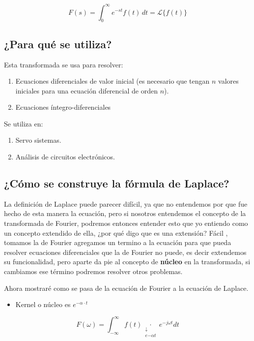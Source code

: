 \[
F(s) = \int_{0}^{\infty} \! e^{-st} f(t)  \,dt = \mathscr{L}\{f(t)\}
\]

\subsection{¿Para qué se utiliza?}
\noindent Esta transformada se usa para resolver:
 \begin{enumerate}
	\item Ecuaciones diferenciales de valor inicial (es necesario que tengan $n$ valores iniciales para una ecuación diferencial de orden $n$).
	\item Ecuaciones íntegro-diferenciales
\end{enumerate}

\noindent Se utiliza en:

\begin{enumerate}
	\item Servo sistemas.
	\item Análisis de circuitos electrónicos.
\end{enumerate}

\subsection{¿Cómo se construye la fórmula de Laplace?}


La definición de Laplace puede parecer difícil, ya que  no entendemos por que fue hecho de esta manera la ecuación, pero si nosotros entendemos el concepto de la transformada de Fourier, podremos entonces entender esto que yo entiendo como un concepto extendido de ella, ¿por qué digo que es una extensión? Fácil , tomamos la de Fourier  agregamos un termino a la ecuación para que pueda resolver ecuaciones diferenciales que la de Fourier no puede, es decir extendemos su funcionalidad, pero aparte da pie al concepto de \textbf{núcleo} en la transformada, si cambiamos ese término podremos resolver otros problemas.

Ahora mostraré como se pasa de la ecuación de Fourier a la ecuación de Laplace.

\begin{itemize}
	\item Kernel o núcleo es  $ e^{-\alpha \cdot t} $
\end{itemize}


\begin{equation}
		F(\omega)= \int^{\infty}_{- \infty} f(t)
	\underset{\substack{\downarrow \\ e{- \alpha t}}}{\cdot}
	e^{- j \omega t} dt
\end{equation}

